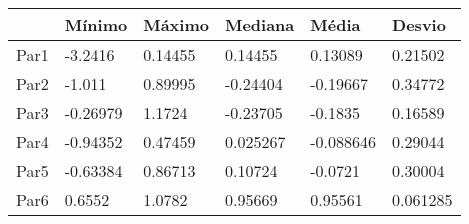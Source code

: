 \begin{tabular}{llllll}
& Mínimo & Máximo & Mediana & Média & Desvio \\ 
\hline 
Par1 & -3.2416 & 0.14455 & 0.14455 & 0.13089 & 0.21502 \\ 
Par2 & -1.011 & 0.89995 & -0.24404 & -0.19667 & 0.34772 \\ 
Par3 & -0.26979 & 1.1724 & -0.23705 & -0.1835 & 0.16589 \\ 
Par4 & -0.94352 & 0.47459 & 0.025267 & -0.088646 & 0.29044 \\ 
Par5 & -0.63384 & 0.86713 & 0.10724 & -0.0721 & 0.30004 \\ 
Par6 & 0.6552 & 1.0782 & 0.95669 & 0.95561 & 0.061285 \\ 
\hline 
\end{tabular}